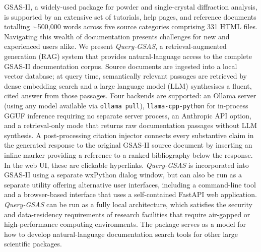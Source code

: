 GSAS-II, a widely-used package for powder and single-crystal
diffraction analysis, is supported by an extensive set of tutorials, help pages,
and reference documents totalling $\sim$500,000 words across five source categories comprising 331 HTML files.
Navigating this wealth of documentation presents challenges for new and experienced users alike.
We present \textit{Query-GSAS}, a retrieval-augmented generation (RAG)
system that provides natural-language access to the complete GSAS-II
documentation corpus.
Source documents are ingested into a local vector database; at query time, semantically relevant passages are retrieved by dense embedding search and a large language model (LLM) synthesises a fluent, cited answer from those passages.
Four backends are supported: an Ollama server (using any model available via
\texttt{ollama pull}), \texttt{llama-cpp-python} for in-process GGUF
inference requiring no separate server process, an Anthropic API option, and a retrieval-only mode that returns raw documentation passages without LLM synthesis.
A post-processing citation injector connects every substantive claim in
the generated response to the original GSAS-II source document by inserting
an inline marker providing a reference to a ranked bibliography below the response.
In the web UI, these are clickable hyperlinks.
\textit{Query-GSAS} is incorporated into GSAS-II using a separate wxPython dialog window, but can also be run as a separate utility offering alternative user interfaces, including a command-line tool and a browser-based interface that uses a self-contained FastAPI web application. \textit{Query-GSAS} can be run as a fully local architecture, which satisfies the security and data-residency requirements of research facilities that require air-gapped or high-performance computing environments. The package serves as a model for how to develop natural-language documentation search tools for other large scientific packages. 